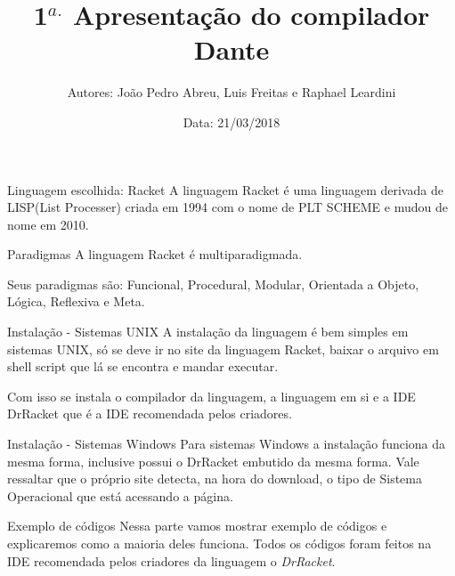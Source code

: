 \documentclass{beamer}
\title[Compiladores 2018.1]{1$^{a.}$ Apresentação do compilador Dante}
\author[Abrev.]{Autores: João Pedro Abreu, Luis Freitas e Raphael Leardini}
\institute[UFF]{Universidade Federal Fluminense}
\date{Data: 21/03/2018}
\begin{document}

\begin{frame}[plain]

\titlepage

\end{frame}


\begin{frame}{Linguagem escolhida: Racket}
A linguagem Racket é uma linguagem derivada de LISP(List Processer) criada em 1994 com o nome de PLT SCHEME e mudou de nome em 2010.
\end{frame}


\begin{frame}{Paradigmas}
A linguagem Racket é multiparadigmada.

Seus paradigmas são: Funcional, Procedural, Modular, Orientada a Objeto, Lógica, Reflexiva e Meta.

\end{frame}


\begin{frame}{Instalação - Sistemas UNIX}
A instalação da linguagem é bem simples em sistemas UNIX, só se deve ir no site da linguagem Racket, baixar o arquivo em shell script que lá se encontra e mandar executar.

Com isso se instala o compilador da linguagem, a linguagem em si e a IDE DrRacket que é a IDE recomendada pelos criadores.



\end{frame}


\begin{frame}{Instalação - Sistemas Windows}
Para sistemas Windows a instalação funciona da mesma forma, inclusive possui o DrRacket embutido da mesma forma. Vale ressaltar que o próprio site detecta, na hora do download, o tipo de Sistema Operacional que está acessando a página.

\end{frame}


\begin{frame}{Exemplo de códigos}
Nessa parte vamos mostrar exemplo de códigos e explicaremos como a maioria deles funciona.
Todos os códigos foram feitos na IDE recomendada pelos criadores da linguagem o \textit{DrRacket}.
\end{frame}
\end{document}

